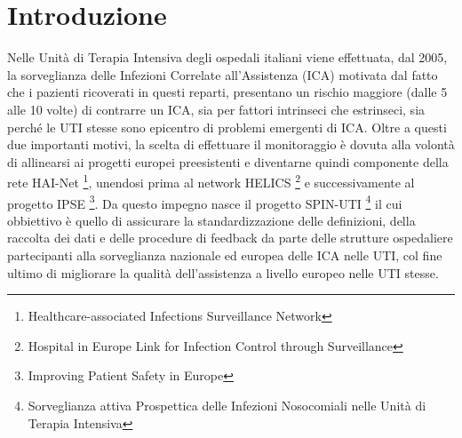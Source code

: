 \chapter{Introduzione}
Nelle Unità di Terapia Intensiva degli ospedali italiani viene effettuata, dal 2005, la sorveglianza delle Infezioni Correlate all'Assistenza (ICA) motivata dal fatto che i pazienti ricoverati in questi reparti, presentano un rischio maggiore (dalle 5 alle 10 volte) di contrarre un ICA, sia per fattori intrinseci che estrinseci, sia perché le UTI stesse sono epicentro di problemi emergenti di ICA. Oltre a questi due importanti motivi, la scelta di effettuare il monitoraggio è dovuta alla volontà di allinearsi ai progetti europei preesistenti e diventarne quindi componente della rete HAI-Net \footnote{Healthcare-associated Infections Surveillance Network},  
unendosi prima al network HELICS \footnote{Hospital in Europe Link for Infection Control through Surveillance} e successivamente al progetto IPSE \footnote{Improving Patient Safety in Europe}.
Da questo impegno nasce il progetto SPIN-UTI 
\footnote{Sorveglianza attiva Prospettica delle Infezioni Nosocomiali nelle Unità di Terapia Intensiva} il cui obbiettivo è quello di assicurare la standardizzazione delle definizioni, della raccolta dei dati e delle procedure di feedback da parte delle strutture ospedaliere partecipanti alla sorveglianza nazionale ed europea delle ICA nelle UTI, col fine ultimo di migliorare la qualità dell'assistenza a livello europeo nelle UTI stesse. \cite{progettoSpinuti}
\newpage
